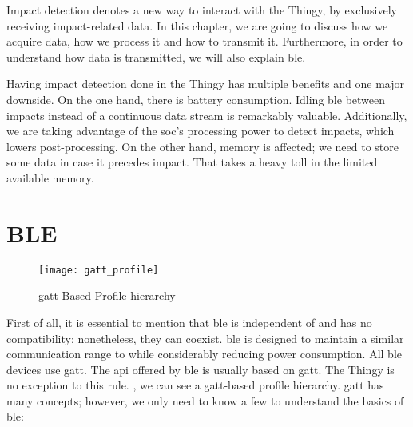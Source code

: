 Impact detection denotes a new way to interact with the Thingy, by exclusively receiving impact-related data. In this chapter, we are going to discuss how we acquire data, how we process it and how to transmit it. Furthermore, in order to understand how data is transmitted, we will also explain \gls{ble}.

Having impact detection done in the Thingy has multiple benefits and one major downside. On the one hand, there is battery consumption. Idling \gls{ble} between impacts instead of a continuous data stream is remarkably valuable. Additionally, we are taking advantage of the \gls{soc}'s processing power to detect impacts, which lowers post-processing. On the other hand, memory is affected; we need to store some data in case it precedes impact. That takes a heavy toll in the limited available memory.

\section{BLE}\label{sc:ble}
\begin{figure}[hbt!]
	\centering
	\texttt{[image: gatt\_profile]}
	\caption{\gls{gatt}-Based Profile hierarchy}
	\label{fig:gatt}
\end{figure}

First of all, it is essential to mention that \gls{ble} is independent of \bt and has no compatibility; nonetheless, they can coexist. \gls{ble} is designed to maintain a similar communication range to \bt while considerably reducing power consumption. All \gls{ble} devices use \gls{gatt}. The \gls{api} offered by \gls{ble} is usually based on \gls{gatt}. The Thingy is no exception to this rule. , we can see a \gls{gatt}-based profile hierarchy. \gls{gatt} has many concepts; however, we only need to know a few to understand the basics of \gls{ble}:

